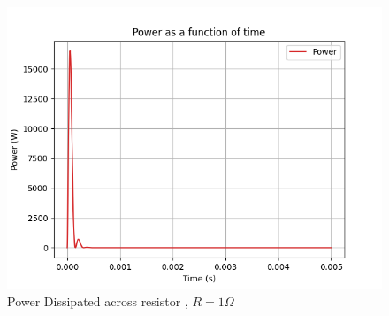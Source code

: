 \documentclass[journal,12pt,twocolumn]{IEEEtran}
\theoremstyle{remark}
\begin{document}
\begin{figure}[H]
    \includegraphics[width=1\columnwidth]{figs/Power Dissipated across Resistor.png}
    \caption{Power Dissipated across resistor , $R=1\Omega$}
    \label{fig:power_in_damping}
\end{figure}
\end{document}
